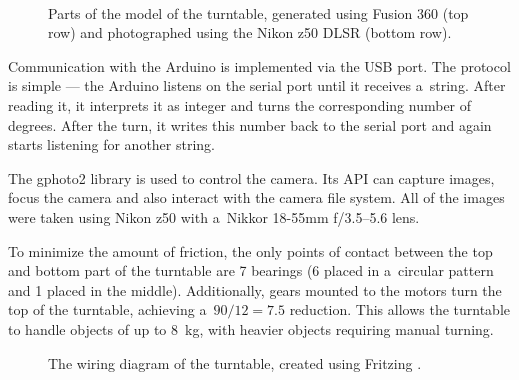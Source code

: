 \begin{figure}[b!]
	\centering
	\hfill
	\hfill
	\\
	\hfill
	\hfill
	\hspace{1.2em}
	\caption{Parts of the model of the turntable, generated using Fusion 360 (top row) and photographed using the Nikon z50 DLSR (bottom row). }%
	\label{fig:turntable}
\end{figure}

Communication with the Arduino is implemented via the USB port.
The protocol is simple --- the Arduino listens on the serial port until it receives a~string.
After reading it, it interprets it as integer and turns the corresponding number of degrees.
After the turn, it writes this number back to the serial port and again starts listening for another string.

The gphoto2 \cite{gphoto2} library is used to control the camera.
Its API can capture images, focus the camera and also interact with the camera file system.
All of the images were taken using Nikon z50 with a~Nikkor 18-55mm f/3.5--5.6 lens.

To minimize the amount of friction, the only points of contact between the top and bottom part of the turntable are 7 bearings (6 placed in a~circular pattern and 1 placed in the middle).
Additionally, gears mounted to the motors turn the top of the turntable, achieving a~$90/12 = 7.5$ reduction.
This allows the turntable to handle objects of up to \SI{8}{\kilo\gram}, with heavier objects requiring manual turning.

\begin{figure}[t]
	\centering
	
	\caption{The wiring diagram of the turntable, created using Fritzing \cite{fritzing}.}
	\label{fig:wiring}
\end{figure}

